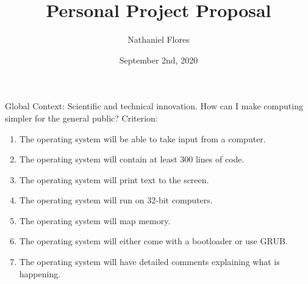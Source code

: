 \documentclass{article}
\title{Personal Project Proposal}
\date{September 2nd, 2020}
\author{Nathaniel Flores}
\begin{document}
 \maketitle
 Global Context: Scientific and technical innovation.
 How can I make computing simpler for the general public?
 \newline
 \newline
 Criterion:
 \begin{enumerate}
  \item The operating system will be able to take input from a computer.
  \item The operating system will contain at least 300 lines of code.
  \item The operating system will print text to the screen.
  \item The operating system will run on 32-bit computers.
  \item The operating system will map memory.
  \item The operating system will either come with a bootloader or use GRUB.
  \item The operating system will have detailed comments explaining what is happening.
 \end{enumerate}
\end{document}
